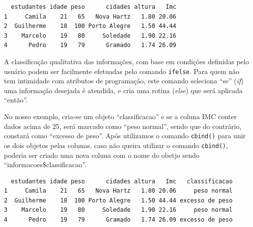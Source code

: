 \documentclass[12pt,brazil,oneside]{book}
\newenvironment{Shaded}{\begin{snugshade}}{\end{snugshade}}
\newcommand{\CommentTok}[1]{\textcolor[rgb]{0.56,0.35,0.01}{\textit{#1}}}
\newcommand{\DecValTok}[1]{\textcolor[rgb]{0.00,0.00,0.81}{#1}}
\newcommand{\KeywordTok}[1]{\textcolor[rgb]{0.13,0.29,0.53}{\textbf{#1}}}
\newcommand{\NormalTok}[1]{#1}
\newcommand{\OperatorTok}[1]{\textcolor[rgb]{0.81,0.36,0.00}{\textbf{#1}}}
\newcommand{\StringTok}[1]{\textcolor[rgb]{0.31,0.60,0.02}{#1}}
\begin{document}
\begin{Shaded}
\end{Shaded}

\begin{verbatim}
  estudantes idade peso      cidades altura   Imc
1     Camila    21   65   Nova Hartz   1.80 20.06
2  Guilherme    18  100 Porto Alegre   1.50 44.44
3    Marcelo    19   80     Soledade   1.90 22.16
4      Pedro    19   79      Gramado   1.74 26.09
\end{verbatim}

A classificação qualitativa das informações, com base em condições
definidas pelo usuário podem ser facilmente efetuadas pelo comando
\texttt{ifelse}. Para quem não tem intimidade com atributos de
programação, este comando seleciona ``se'' (\emph{if}) uma informação
desejada é atendida, e cria uma rotina (\emph{else}) que será aplicada
``então''.

No nosso exemplo, cria-se um objeto ``classificacao'' e se a coluna IMC
conter dados acima de 25, será marcado como ``peso normal'', sendo que
do contrário, constará como ``excesso de peso''. Após utilizamos o
comando \texttt{cbind()} para unir os dois objetos pelas colunas. caso
não queira utilizar o comando \texttt{cbind()}, poderia ser criado uma
nova coluna com o nome do obetjo sendo ``informacoes\$classificacao''.

\begin{Shaded}
\end{Shaded}

\begin{verbatim}
  estudantes idade peso      cidades altura   Imc   classificacao
1     Camila    21   65   Nova Hartz   1.80 20.06     peso normal
2  Guilherme    18  100 Porto Alegre   1.50 44.44 excesso de peso
3    Marcelo    19   80     Soledade   1.90 22.16     peso normal
4      Pedro    19   79      Gramado   1.74 26.09 excesso de peso
\end{verbatim}
\end{document}
